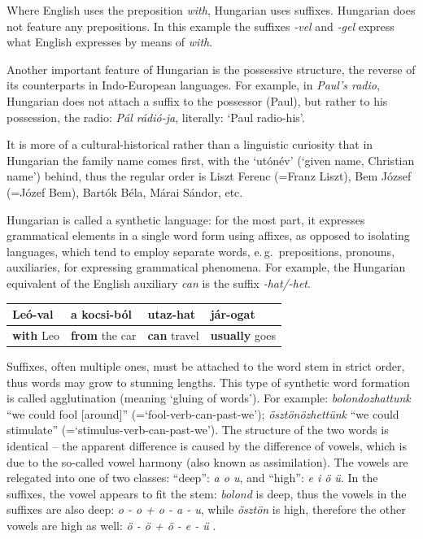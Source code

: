 \begin{multicols}{2}
  Where English uses the preposition \textit{with}, Hungarian uses suffixes. Hungarian does not feature any prepositions. In this example the suffixes \textit{-vel} and \textit{-gel} express what English expresses by means of \textit{with}. 

  Another important feature of Hungarian is the possessive structure, the reverse of its counterparts in Indo-European languages. For example, in \textit{Paul's radio}, Hungarian does not attach a suffix to the possessor (Paul), but rather to his possession, the radio: \textit{Pál rádió-ja}, literally: `Paul radio-his'. 

  It is more of a cultural-historical rather than a linguistic curiosity that in Hungarian the family name comes first, with the `utónév' (`given name, Christian name') behind, thus the regular order is Liszt Ferenc (=Franz Liszt), Bem József (=Józef Bem), Bartók Béla, Márai Sándor, etc.

  Hungarian is called a synthetic language: for the most part, it expresses grammatical elements in a single word form using affixes, as opposed to isolating languages, which tend to employ separate words, e.\,g.~prepositions, pronouns, auxiliaries, for expressing grammatical phenomena. For example, the Hungarian equivalent of the English auxiliary \textit{can} is the suffix \textit{-hat/-het}.

  \vspace{3mm} 

  \begin{tabular}{l|l|l|l}
      Leó-\textbf{val} & a kocsi-\textbf{ból} & utaz-\textbf{hat} & jár-\textbf{ogat}\\
      \hline
      \textbf{with} Leo & \textbf{from} the car & \textbf{can} travel & \textbf{usually} goes \\
    \end{tabular}

  \vspace{3mm} 

  Suffixes, often multiple ones, must be attached to the word stem in strict order, thus words may grow to stunning lengths. This type of synthetic word formation is called agglutination (meaning `gluing of words'). For example: \textit{bolondozhattunk} ``we could fool [around]'' (=`fool-verb-can-past-we'); \textit{ösztönözhettünk} ``we could stimulate'' (=`stimulus-verb-can-past-we'). The structure of the two words is identical -- the apparent difference is caused by the difference of vowels, which is due to the so-called vowel harmony (also known as assimilation). The vowels are relegated into one of two classes: ``deep'': \textit{a o u}, and ``high'': \textit{e i ö ü}. In the suffixes, the vowel appears to fit the stem: \textit{bolond} is deep, thus the vowels in the suffixes are also deep: \textit{o - o + o - a - u}, while \textit{ösztön} is high, therefore the other vowels are high as well: \textit{ö - ö + ö - e - ü} \cite{didyouknow1}.


\end{multicols}
